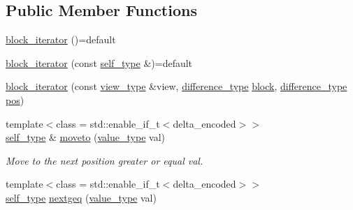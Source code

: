 \subsection*{Public Member Functions}
\begin{DoxyCompactItemize}
\item 
\mbox{\hyperlink{classirk_1_1index_1_1block__iterator_ad6c58cc01009120754c5c3797a6deb82}{block\+\_\+iterator}} ()=default
\item 
\mbox{\hyperlink{classirk_1_1index_1_1block__iterator_a00174f254405749a39d2009b2a6819bf}{block\+\_\+iterator}} (const \mbox{\hyperlink{classirk_1_1index_1_1block__iterator_a338ee8fee726492e9f8bbad4b4d75766}{self\+\_\+type}} \&)=default
\item 
\mbox{\hyperlink{classirk_1_1index_1_1block__iterator_a485803aa36bf95c6c5e401e44a432c1b}{block\+\_\+iterator}} (const \mbox{\hyperlink{classirk_1_1index_1_1block__iterator_a75bc89b691db97f719af7284ee91afa0}{view\+\_\+type}} \&view, \mbox{\hyperlink{classirk_1_1index_1_1block__iterator_a3a314c46329b349e7534670b21978ab6}{difference\+\_\+type}} \mbox{\hyperlink{classirk_1_1index_1_1block__iterator_ae172ebede460597574078b85ae820a4c}{block}}, \mbox{\hyperlink{classirk_1_1index_1_1block__iterator_a3a314c46329b349e7534670b21978ab6}{difference\+\_\+type}} \mbox{\hyperlink{classirk_1_1index_1_1block__iterator_a36dd1b7e5b2b3d3b8865030c239d4ac9}{pos}})
\item 
{\footnotesize template$<$class  = std\+::enable\+\_\+if\+\_\+t$<$delta\+\_\+encoded$>$$>$ }\\\mbox{\hyperlink{classirk_1_1index_1_1block__iterator_a338ee8fee726492e9f8bbad4b4d75766}{self\+\_\+type}} \& \mbox{\hyperlink{classirk_1_1index_1_1block__iterator_a1809157e963a0ec3569c5abc50467810}{moveto}} (\mbox{\hyperlink{classirk_1_1index_1_1block__iterator_a4d6c5b58cedd871e8a8f235e425e8587}{value\+\_\+type}} val)
\begin{DoxyCompactList}\small\item\em Move to the next position greater or equal {\ttfamily val}. \end{DoxyCompactList}\item 
{\footnotesize template$<$class  = std\+::enable\+\_\+if\+\_\+t$<$delta\+\_\+encoded$>$$>$ }\\\mbox{\hyperlink{classirk_1_1index_1_1block__iterator_a338ee8fee726492e9f8bbad4b4d75766}{self\+\_\+type}} \mbox{\hyperlink{classirk_1_1index_1_1block__iterator_aae123dcccac278876262bf6514669e43}{nextgeq}} (\mbox{\hyperlink{classirk_1_1index_1_1block__iterator_a4d6c5b58cedd871e8a8f235e425e8587}{value\+\_\+type}} val)

\end{DoxyCompactItemize}
